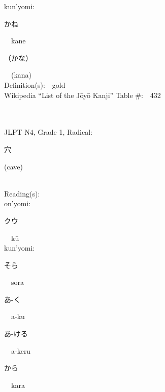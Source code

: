 \begin{multicols}{2}
{\hspace*{1em}}kun'yomi:\ \ \\
{\hspace*{2em}}{\begin{CJK}{UTF8}{min} かね \end{CJK}}\ \ kane\ \ \\
{\hspace*{2em}}{\begin{CJK}{UTF8}{min} （かな） \end{CJK}}\ \ (kana)\ \ \\
Definition(s):\ \ gold \\
Wikipedia ``List of the J\=oy\=o Kanji'' Table \#:\ \ 432 \\
\ \ \\
{\fontsize{34pt}{40pt}  }\ \ \\  %
{JLPT N4, Grade 1, Radical:\ \ {\begin{CJK}{UTF8}{min} 穴 \end{CJK}} (cave) } \\
Reading(s):\ \ \\
{\hspace*{1em}}on'yomi:\ \ \\
{\hspace*{2em}}{\begin{CJK}{UTF8}{min} クウ \end{CJK}}\ \ k\=u\ \ \\
{\hspace*{1em}}kun'yomi:\ \ \\
{\hspace*{2em}}{\begin{CJK}{UTF8}{min} そら \end{CJK}}\ \ sora\ \ \\
{\hspace*{2em}}{\begin{CJK}{UTF8}{min} あ-く \end{CJK}}\ \ a-ku\ \ \\
{\hspace*{2em}}{\begin{CJK}{UTF8}{min} あ-ける \end{CJK}}\ \ a-keru\ \ \\
{\hspace*{2em}}{\begin{CJK}{UTF8}{min} から \end{CJK}}\ \ kara\ \ \\

\end{multicols}
